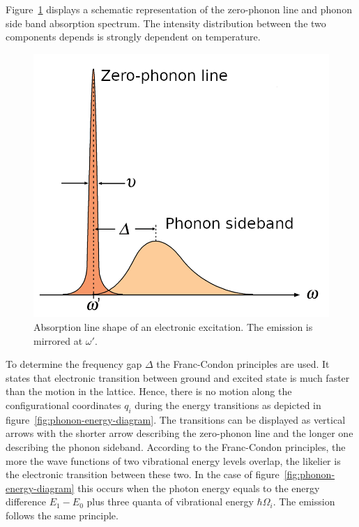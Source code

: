 Figure~\ref{fig:line-shape} displays a schematic representation of the zero-phonon line and phonon side band absorption spectrum.
The intensity distribution between the two components depends is strongly dependent on temperature.
\begin{figure}[H]
	\centering
	\includegraphics[width=0.6\linewidth]{figures/quantum-dot/Line-shape}
	\caption[Absorption line shape of an electronic excitation.]{Absorption line shape of an electronic excitation.
	The emission is mirrored at $\omega'$.}
	\label{fig:line-shape}
\end{figure}
To determine the frequency gap $\Delta$ the Franc-Condon principles are used. It states that electronic transition between ground and excited state is much faster than the motion in the lattice.
Hence, there is no motion along the configurational coordinates $q_i$ during the energy transitions as depicted in figure~\ref{fig:phonon-energy-diagram}.
The transitions can be displayed as vertical arrows with the shorter arrow describing the zero-phonon line and the longer one describing the phonon sideband.
According to the Franc-Condon principles, the more the wave functions of two vibrational energy levels overlap, the likelier is the electronic transition between these two.
In the case of figure~\ref{fig:phonon-energy-diagram} this occurs when the photon energy equals to the energy difference $E_1-E_0$ plus three quanta of vibrational energy $\hbar \Omega_i$.
The emission follows the same principle.

